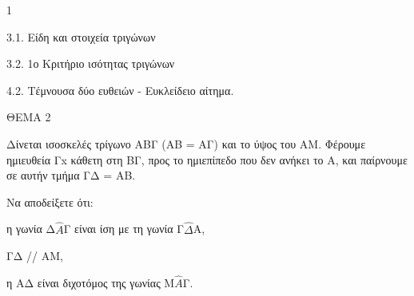 \begin{ylh}{1}
    \item 3.1. Είδη και στοιχεία τριγώνων
    \item 3.2. 1ο Κριτήριο ισότητας τριγώνων
    \item 4.2. Τέμνουσα δύο ευθειών - Ευκλείδειο αίτημα.
\end{ylh}

ΘΕΜΑ 2

Δίνεται ισοσκελές τρίγωνο ΑΒΓ (ΑΒ = ΑΓ) και το ύψος του ΑΜ. Φέρουμε ημιευθεία Γx κάθετη στη ΒΓ, προς το ημιεπίπεδο που δεν ανήκει το Α, και παίρνουμε σε αυτήν τμήμα ΓΔ = ΑΒ.

Να αποδείξετε ότι:

\begin{alist}
\item η γωνία Δ$\widehat{Α}$Γ είναι ίση με τη γωνία Γ$\widehat{\Delta}$Α, 

\item ΓΔ // ΑΜ, 

\item η ΑΔ είναι διχοτόμος της γωνίας Μ$\widehat{Α}$Γ. 


\begin{center}
\end{center}
\end{alist}
